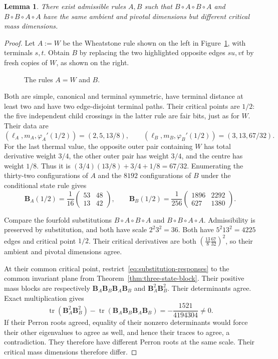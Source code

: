 \documentclass[scheme=plain,11pt]{ctexart}
\newtheorem{lemma}[theorem]{Lemma}
\theoremstyle{definition}
\theoremstyle{remark}
\begin{document}
\begin{lemma}\label{lem:permutation-obstruction}
There exist admissible rules $A,B$ such that $B\circ A\circ B\circ A$ and $B\circ B\circ A\circ A$ have the same ambient and pivotal dimensions but different critical mass dimensions.
\end{lemma}
\begin{proof}
Let $A:=W$ be the Wheatstone rule shown on the left in Figure~\ref{fig:wheatstone-permutation-rules}, with terminals $s,t$.
Obtain $B$ by replacing the two highlighted opposite edges $su,vt$ by fresh copies of $W$, as shown on the right.
\begin{figure}[tbp]
\centering

\caption{The rules $A=W$ and $B$.}
\label{fig:wheatstone-permutation-rules}
\end{figure}
Both are simple, canonical and terminal symmetric, have terminal distance at least two and have two edge-disjoint terminal paths. Their critical points are $1/2$: the five independent child crossings in the latter rule are fair bits, just as for $W$. Their data are
\[
 (\ell_A,m_A,\varphi_A'(1/2))=(2,5,13/8),\qquad
 (\ell_B,m_B,\varphi_B'(1/2))=(3,13,67/32).
\]
For the last thermal value, the opposite outer pair containing $W$ has total derivative weight $3/4$, the other outer pair has weight $3/4$, and the centre has weight $1/8$. Thus it is $(3/4)(13/8)+3/4+1/8=67/32$.
Enumerating the thirty-two configurations of $A$ and the $8192$ configurations of $B$ under the conditional state rule gives
\[
 \mathbf B_A(1/2)=\frac1{16}\begin{pmatrix}53&48\\13&42\end{pmatrix},
 \qquad
 \mathbf B_B(1/2)=\frac1{256}\begin{pmatrix}1896&2292\\627&1380\end{pmatrix}.
\]

Compare the fourfold substitutions $B\circ A\circ B\circ A$ and $B\circ B\circ A\circ A$. Admissibility is preserved by substitution, and both have scale $2^2 3^2=36$. Both have $5^2 13^2=4225$ edges and critical point $1/2$.
Their critical derivatives are both $(\frac{13}{8}\frac{67}{32})^2$, so their ambient and pivotal dimensions agree.

At their common critical point, restrict~\eqref{eq:substitution-responses} to the common invariant plane from Theorem~\ref{thm:three-state-block}.
Their positive mass blocks are respectively $\mathbf B_A\mathbf B_B\mathbf B_A\mathbf B_B$ and $\mathbf B_A^2\mathbf B_B^2$. Their determinants agree. Exact multiplication gives
\[
 \operatorname{tr}(\mathbf B_A^2\mathbf B_B^2)
 -\operatorname{tr}(\mathbf B_A\mathbf B_B\mathbf B_A\mathbf B_B)
 =-\frac{1521}{4194304}\ne0.
\]
If their Perron roots agreed, equality of their nonzero determinants would force their other eigenvalues to agree as well, and hence their traces to agree, a contradiction. They therefore have different Perron roots at the same scale. Their critical mass dimensions therefore differ.
\end{proof}
\end{document}

